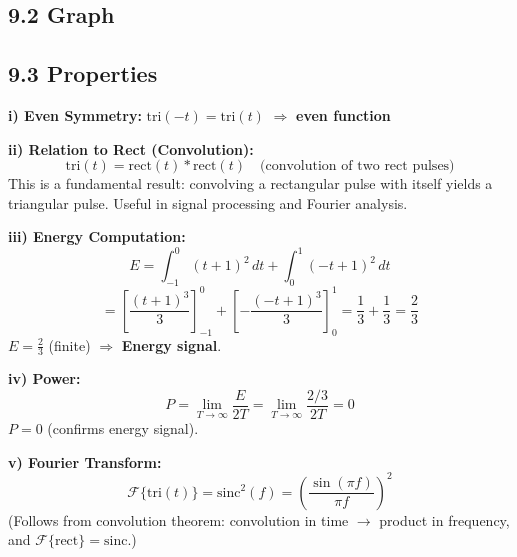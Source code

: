 \documentclass[10pt,a4paper]{article}
\begin{document}
\subsection*{9.2 Graph}

\begin{center}
\end{center}

\subsection*{9.3 Properties}

\begin{propbox}
\textbf{i) Even Symmetry:} $\mathrm{tri}(-t) = \mathrm{tri}(t)$ $\Rightarrow$ \textbf{even function}

\textbf{ii) Relation to Rect (Convolution):}
\[
\mathrm{tri}(t) = \mathrm{rect}(t) * \mathrm{rect}(t) \quad \text{(convolution of two rect pulses)}
\]
This is a fundamental result: convolving a rectangular pulse with itself yields a triangular pulse. Useful in signal processing and Fourier analysis.

\textbf{iii) Energy Computation:}
\[
E = \int_{-1}^{0}(t+1)^2\,dt + \int_{0}^{1}(-t+1)^2\,dt
\]
\[
= \left[\frac{(t+1)^3}{3}\right]_{-1}^{0} + \left[-\frac{(-t+1)^3}{3}\right]_{0}^{1}
= \frac{1}{3} + \frac{1}{3} = \frac{2}{3}
\]
$E = \tfrac{2}{3}$ (finite) $\Rightarrow$ \textbf{Energy signal}.

\textbf{iv) Power:}
\[
P = \lim_{T\to\infty}\frac{E}{2T} = \lim_{T\to\infty}\frac{2/3}{2T} = 0
\]
$P = 0$ (confirms energy signal).

\textbf{v) Fourier Transform:}
\[
\mathcal{F}\{\mathrm{tri}(t)\} = \mathrm{sinc}^2(f) = \left(\frac{\sin(\pi f)}{\pi f}\right)^2
\]
(Follows from convolution theorem: convolution in time $\to$ product in frequency, and $\mathcal{F}\{\mathrm{rect}\} = \mathrm{sinc}$.)
\end{propbox}
\end{document}

